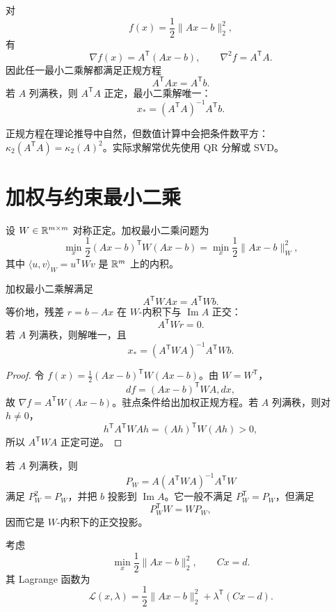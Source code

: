 \begin{corollary}[线性最小二乘的正规方程]
对
\[
f(x)=\frac12\lVert Ax-b\rVert_2^2,
\]
有
\[
\nabla f(x)=A^{\mathsf T}(Ax-b),
\qquad
\nabla^2f=A^{\mathsf T}A.
\]
因此任一最小二乘解都满足正规方程
\[
A^{\mathsf T}Ax=A^{\mathsf T}b.
\]
若 $A$ 列满秩，则 $A^{\mathsf T}A$ 正定，最小二乘解唯一：
\[
x_*=(A^{\mathsf T}A)^{-1}A^{\mathsf T}b.
\]
\end{corollary}

\begin{remark}
正规方程在理论推导中自然，但数值计算中会把条件数平方：
$\kappa_2(A^{\mathsf T}A)=\kappa_2(A)^2$。实际求解常优先使用 QR 分解或 SVD。
\end{remark}

\section{加权与约束最小二乘}

\begin{definition}[加权最小二乘]
设 $W\in\mathbb{R}^{m\times m}$ 对称正定。加权最小二乘问题为
\[
\min_x\frac12(Ax-b)^{\mathsf T}W(Ax-b)
=\min_x\frac12\lVert Ax-b\rVert_W^2,
\]
其中 $\langle u,v\rangle_W=u^{\mathsf T}Wv$ 是 $\mathbb{R}^m$ 上的内积。
\end{definition}

\begin{theorem}[加权正规方程]
加权最小二乘解满足
\[
A^{\mathsf T}WAx=A^{\mathsf T}Wb.
\]
等价地，残差 $r=b-Ax$ 在 $W$-内积下与 $\operatorname{Im}A$ 正交：
\[
A^{\mathsf T}Wr=0.
\]
若 $A$ 列满秩，则解唯一，且
\[
x_*=(A^{\mathsf T}WA)^{-1}A^{\mathsf T}Wb.
\]
\end{theorem}
\begin{proof}
令 $f(x)=\frac12(Ax-b)^{\mathsf T}W(Ax-b)$。由 $W=W^{\mathsf T}$，
\[
df=(Ax-b)^{\mathsf T}WA,dx,
\]
故 $\nabla f=A^{\mathsf T}W(Ax-b)$。驻点条件给出加权正规方程。若 $A$ 列满秩，则对 $h\ne0$，
\[
h^{\mathsf T}A^{\mathsf T}WAh=(Ah)^{\mathsf T}W(Ah)>0,
\]
所以 $A^{\mathsf T}WA$ 正定可逆。
\end{proof}

\begin{corollary}[加权正交投影]
若 $A$ 列满秩，则
\[
P_W=A(A^{\mathsf T}WA)^{-1}A^{\mathsf T}W
\]
满足 $P_W^2=P_W$，并把 $b$ 投影到 $\operatorname{Im}A$。它一般不满足 $P_W^{\mathsf T}=P_W$，但满足
\[
P_W^{\mathsf T}W=WP_W,
\]
因而它是 $W$-内积下的正交投影。
\end{corollary}

\begin{definition}[等式约束最小二乘]
考虑
\[
\min_x\frac12\lVert Ax-b\rVert_2^2,
\qquad Cx=d.
\]
其 Lagrange 函数为
\[
\mathcal L(x,\lambda)
=\frac12\lVert Ax-b\rVert_2^2
+\lambda^{\mathsf T}(Cx-d).
\]
\end{definition}

